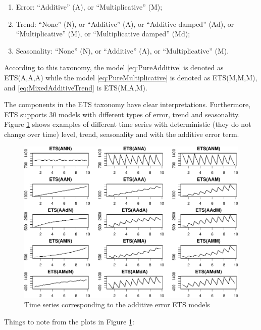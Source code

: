 \documentclass[
]{book}
\providecommand{\tightlist}{%
  \setlength{\itemsep}{0pt}\setlength{\parskip}{0pt}}
\theoremstyle{definition}
\theoremstyle{definition}
\theoremstyle{definition}
\theoremstyle{definition}
\theoremstyle{remark}
\begin{document}
\begin{enumerate}
\def\labelenumi{\arabic{enumi}.}
\tightlist
\item
  Error: ``Additive'' (A), or ``Multiplicative'' (M);
\item
  Trend: ``None'' (N), or ``Additive'' (A), or ``Additive damped'' (Ad), or ``Multiplicative'' (M), or ``Multiplicative damped'' (Md);
\item
  Seasonality: ``None'' (N), or ``Additive'' (A), or ``Multiplicative'' (M).
\end{enumerate}

According to this taxonomy, the model \eqref{eq:PureAdditive} is denoted as ETS(A,A,A) while the model \eqref{eq:PureMultiplicative} is denoted as ETS(M,M,M), and \eqref{eq:MixedAdditiveTrend} is ETS(M,A,M).

The components in the ETS taxonomy have clear interpretations. Furthermore, ETS supports 30 models with different types of error, trend and seasonality. Figure \ref{fig:ETSTaxonomyAdditive} shows examples of different time series with deterministic (they do not change over time) level, trend, seasonality and with the additive error term.

\begin{figure}
\centering
\includegraphics{Svetunkov--2022----ADAM_files/figure-latex/ETSTaxonomyAdditive-1.pdf}
\caption{\label{fig:ETSTaxonomyAdditive}Time series corresponding to the additive error ETS models}
\end{figure}

Things to note from the plots in Figure \ref{fig:ETSTaxonomyAdditive}:
\end{document}

